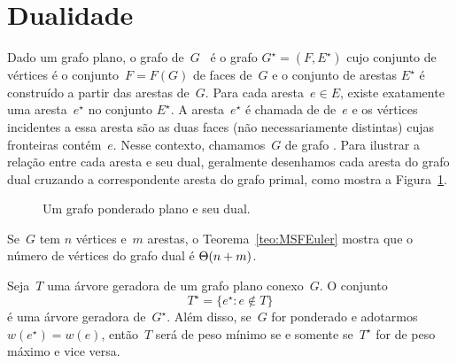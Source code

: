 

\section{Dualidade}
\label{sec:dualidade}


Dado um grafo plano, o grafo  de~$G$~\cite{Diestel} é o grafo $G^\star = (F,E^\star)$ cujo conjunto de vértices é o conjunto~$F = F(G)$ de faces de~$G$ e o conjunto de arestas $E^\star$ é construído a partir das arestas de~$G$.
Para cada aresta~$e\in E$, existe exatamente uma aresta~$e^\star$ no conjunto $E^\star$.
A aresta~$e^\star$ é chamada de  de~$e$ e os vértices incidentes a essa aresta são as duas faces (não necessariamente distintas) cujas fronteiras contém~$e$.
Nesse contexto, chamamos~$G$ de grafo .
Para ilustrar a relação entre cada aresta e seu dual, geralmente desenhamos cada aresta do grafo dual cruzando a correspondente aresta do grafo primal, como mostra a Figura~\ref{fig:MSF-basico-1}.

\begin{figure}[htb]
\scalebox{1.5}{
\centering

}
\caption{Um grafo ponderado plano e seu dual.}
\label{fig:MSF-basico-1}
\end{figure}


Se~$G$ tem $n$ vértices e~$m$ arestas, o Teorema~\ref{teo:MSFEuler} mostra que o número de vértices do grafo dual é $\Theta(n+m)$.

\begin{theorem}
\label{teo:MSFdual}
Seja~$T$ uma árvore geradora de um grafo plano conexo~$G$. O conjunto
$$
T^\star = \{e^\star:e\notin T\}
$$
é uma árvore geradora de~$G^\star$.
Além disso, se~$G$ for ponderado e adotarmos $w(e^\star) = w(e)$, então~$T$ será de peso mínimo se e somente se~$T^\star$ for de peso máximo e vice versa.
\end{theorem}

